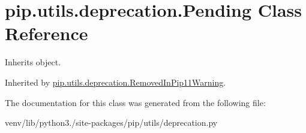 \hypertarget{classpip_1_1utils_1_1deprecation_1_1_pending}{}\section{pip.\+utils.\+deprecation.\+Pending Class Reference}
\label{classpip_1_1utils_1_1deprecation_1_1_pending}


Inherits object.



Inherited by \hyperlink{classpip_1_1utils_1_1deprecation_1_1_removed_in_pip11_warning}{pip.\+utils.\+deprecation.\+Removed\+In\+Pip11\+Warning}.



The documentation for this class was generated from the following file\+:\begin{DoxyCompactItemize}
\item 
venv/lib/python3./site-\/packages/pip/utils/deprecation.\+py\end{DoxyCompactItemize}
